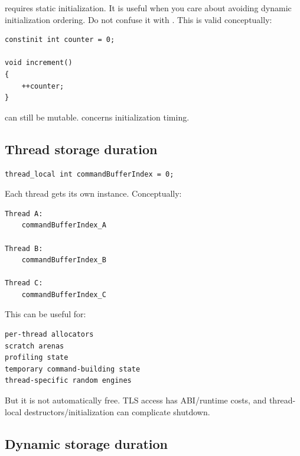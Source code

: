  requires static initialization. It is useful when you care about avoiding dynamic initialization ordering. Do not confuse it with . This is valid conceptually:

\begin{verbatim}
constinit int counter = 0;

void increment()
{
    ++counter;
}
\end{verbatim}

 can still be mutable.  concerns initialization timing.

\subsection{Thread storage duration}\label{01-foundations-i-ch002-thread-storage-duration}

\hypertarget{01-foundations-i-ch002-thread-storage-duration}{}

\begin{verbatim}
thread_local int commandBufferIndex = 0;
\end{verbatim}

Each thread gets its own instance. Conceptually:

\begin{verbatim}
Thread A:
    commandBufferIndex_A

Thread B:
    commandBufferIndex_B

Thread C:
    commandBufferIndex_C
\end{verbatim}

This can be useful for:

\begin{verbatim}
per-thread allocators
scratch arenas
profiling state
temporary command-building state
thread-specific random engines
\end{verbatim}

But it is not automatically free. TLS access has ABI/runtime costs, and thread-local destructors/initialization can complicate shutdown.

\subsection{Dynamic storage duration}\label{01-foundations-i-ch002-dynamic-storage-duration}

\hypertarget{01-foundations-i-ch002-dynamic-storage-duration}{}

